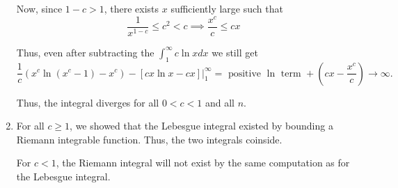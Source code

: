 \documentclass[12pt]{Qual}
\begin{document}
\begin{solution}
\begin{enumerate}[label=(\alph*)]
Now, since $1-c>1$, there exists $x$ sufficiently large such that $$\frac{1}{x^{1-c}}\le c^2<c\implies \frac{x^c}{c}\le cx$$

Thus, even after subtracting the $\int_1^\infty c\ln xdx$ we still get
$$\frac{1}{c}(x^c\ln(x^c-1)-x^c)-[cx\ln x-cx]\bigg|_1^\infty=\text{ positive }\ln\text{ term }+(cx-\frac{x^c}{c})\to\infty.$$

Thus, the integral diverges for all $0<c<1$ and all $n$.



\begin{comment}
    Pick $m$ to be the smallest even integer such that $\frac{1}{m}\le c$. Then $x^{1/m}\le x^c$ and so $\frac{1}{x^{1/m}}\ge\frac{1}{x^c}$ for all $x\ge1$. Then $$\ln\left(1-\frac{1}{x^c}\right)\ge\ln\left(1-\frac{1}{x^{1/m}}\right)$$ so \begin{align*}
        \int_1^\infty\ln\left(1+\frac{(\sin x)^n}{x^c}\right)dx&\ge\int_1^\infty\ln\left(\frac{x^{1/m}-1}{x^{1/m}}\right)dx\\
        &=\int_1^\infty\ln(x^{1/m}-1)-\frac{1}{m}\ln xdx\\
    \end{align*}

    Now, \begin{align*}
        \int_1^\infty\ln(x^{1/m}-1)dx&=\int_1^\infty\frac{mx^{1/m-1}}{mx^{1/m-1}}\ln(x^{1/m}-1)dx\\
        &=\int_1^\infty mu^{m-1}\ln(u-1)du\qquad \begin{matrix}
    u=x^{1/m} &  u^m=x\\
    du=\frac{1}{m}x^{1/m}dx &
\end{matrix}\\
        &=u^m\ln(u-1)-\int\frac{u^m}{u-1}du\qquad\begin{matrix}
    w=ln(u-1) &  dv=mu^{m-1}\\
    dw=\frac{1}{u-1}dx & v=u^m
\end{matrix}\\
        &=u^m\ln(u-1)-\int u^{m-1}+u^{m-2}\cdots+1+\frac{1}{u-1}du\\
        &=u^m\ln(u-1)-\frac{u^m}{m}-\cdots-u-\ln(u-1)\\
        &=x\ln(x^{1/m}-1)-\frac{x}{m}-\cdots-x^{1/m}-\ln(x^{1/m}-1)
    \end{align*}
    Finally, even after subtracting the $\int\frac{1}{m}\ln xdx$, we still have at least an $\ln(x^{1/m}-1)$ term which diverges as $x\to\infty$.

    Thus, the integral does not exist for all $0<c<1$ and all $n$.
\end{comment}
    \item For all $c\ge1$, we showed that the Lebesgue integral existed by bounding a Riemann integrable function. Thus, the two integrals coinside.

    For $c< 1$, the Riemann integral will not exist by the same computation as for the Lebesgue integral.
\end{enumerate}
\end{solution}
\newpage
\end{document}
